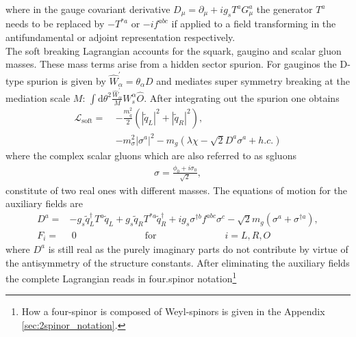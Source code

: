 where in the gauge covariant derivative $D_\mu = \partial_\mu +ig_sT^aG^a_\mu$ the generator $T^a$ needs to be replaced by $-T^{\ast a}$ or $-if^{abc}$ if applied to a field transforming in the antifundamental or adjoint representation respectively.\\
The soft breaking Lagrangian accounts for the squark, gaugino and scalar gluon masses. These mass terms arise from a hidden sector spurion. For gauginos the D-type spurion is given by $\hat{W}_\alpha^\prime = \theta_\alpha D$ and mediates super symmetry breaking at the mediation scale $M$: $\int\mathrm{d}\theta^2\frac{\hat{W}_\alpha^\prime}{M}W_s^\alpha \hat{O}$. After integrating out the spurion one obtains\cite{Fox:2002bu, Diessner:2015bna}
\begin{align}
\mathcal{L}_{\mathrm{soft}} =\ & -\frac{m_{\tilde{q}}^2}{2}(|\tilde{q}_L|^2 + |\tilde{q}_R|^2),\nonumber\\
& -m_{\sigma}^2\left|\sigma^{a}\right|^2 - m_g(\lambda\chi -\sqrt{2}D^a \sigma^a + h.c.)
\end{align}
where the complex scalar gluons which are also referred to as sgluons
\begin{align}
\sigma = \frac{\phi_0 + i\sigma_0}{\sqrt{2}},
\end{align}
constitute of two real ones with different masses.
The equations of motion for the auxiliary fields are
\begin{align}
D^a =& -g_s \tilde{q}_L^\dagger T^a \tilde{q}_L + g_s \tilde{q}_R T^{\ast a} \tilde{q}_R^\dagger + ig_s\sigma^{\dagger b}f^{abc}\sigma^c -\sqrt{2}m_g(\sigma^a + \sigma^{\dagger a}),\\
F_i =&\ 0 \hspace{3cm} \mathrm{for} \hspace{3cm} i = L,R,O
\end{align}
where $D^a$ is still real as the purely imaginary parts do not contribute by virtue of the antisymmetry of the structure constants. After eliminating the auxiliary fields the complete Lagrangian reads in four.spinor notation\footnote{How a four-spinor is composed of Weyl-spinors is given in the Appendix \ref{sec:2spinor_notation}.}

